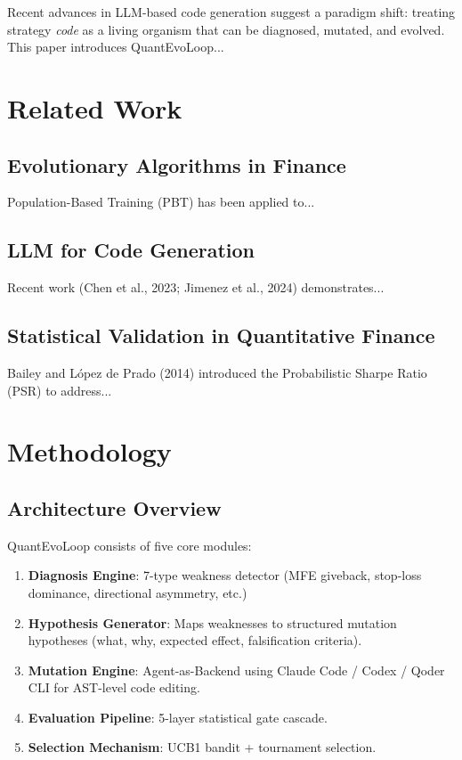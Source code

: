 \documentclass[11pt,a4paper]{article}
\begin{document}
Recent advances in LLM-based code generation suggest a paradigm shift:
treating strategy \emph{code} as a living organism that can be diagnosed,
mutated, and evolved. This paper introduces QuantEvoLoop...

\section{Related Work}
\label{sec:related}

\subsection{Evolutionary Algorithms in Finance}
Population-Based Training (PBT) has been applied to...

\subsection{LLM for Code Generation}
Recent work (Chen et al., 2023; Jimenez et al., 2024) demonstrates...

\subsection{Statistical Validation in Quantitative Finance}
Bailey and L\'{o}pez de Prado (2014) introduced the Probabilistic Sharpe
Ratio (PSR) to address...

\section{Methodology}
\label{sec:method}

\subsection{Architecture Overview}
QuantEvoLoop consists of five core modules:
\begin{enumerate}
  \item \textbf{Diagnosis Engine}: 7-type weakness detector (MFE giveback,
        stop-loss dominance, directional asymmetry, etc.)
  \item \textbf{Hypothesis Generator}: Maps weaknesses to structured mutation
        hypotheses (what, why, expected effect, falsification criteria).
  \item \textbf{Mutation Engine}: Agent-as-Backend using Claude Code / Codex /
        Qoder CLI for AST-level code editing.
  \item \textbf{Evaluation Pipeline}: 5-layer statistical gate cascade.
  \item \textbf{Selection Mechanism}: UCB1 bandit + tournament selection.
\end{enumerate}
\end{document}
